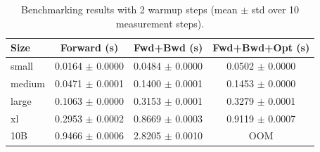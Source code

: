 \begin{table}
\caption{Benchmarking results with 2 warmup steps (mean $\pm$ std over 10 measurement steps).}
\label{tab:benchmarking_warmup2}
\begin{tabular}{lccc}
\toprule
Size & Forward (s) & Fwd+Bwd (s) & Fwd+Bwd+Opt (s) \\
\midrule
small & 0.0164 $\pm$ 0.0000 & 0.0484 $\pm$ 0.0000 & 0.0502 $\pm$ 0.0000 \\
medium & 0.0471 $\pm$ 0.0001 & 0.1400 $\pm$ 0.0001 & 0.1453 $\pm$ 0.0000 \\
large & 0.1063 $\pm$ 0.0000 & 0.3153 $\pm$ 0.0001 & 0.3279 $\pm$ 0.0001 \\
xl & 0.2953 $\pm$ 0.0002 & 0.8669 $\pm$ 0.0003 & 0.9119 $\pm$ 0.0007 \\
10B & 0.9466 $\pm$ 0.0006 & 2.8205 $\pm$ 0.0010 & OOM \\
\bottomrule
\end{tabular}
\end{table}
